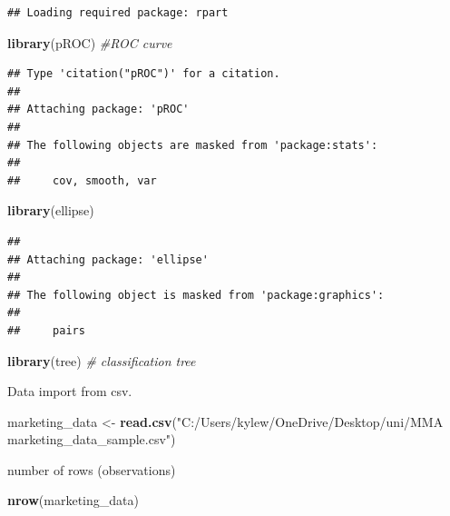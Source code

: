 \documentclass[
]{article}
\newenvironment{Shaded}{\begin{snugshade}}{\end{snugshade}}
\newcommand{\CommentTok}[1]{\textcolor[rgb]{0.56,0.35,0.01}{\textit{#1}}}
\newcommand{\FunctionTok}[1]{\textcolor[rgb]{0.13,0.29,0.53}{\textbf{#1}}}
\newcommand{\NormalTok}[1]{#1}
\newcommand{\OtherTok}[1]{\textcolor[rgb]{0.56,0.35,0.01}{#1}}
\newcommand{\StringTok}[1]{\textcolor[rgb]{0.31,0.60,0.02}{#1}}
\begin{document}
\begin{verbatim}
## Loading required package: rpart
\end{verbatim}

\begin{Shaded}
\begin{Highlighting}[]
\FunctionTok{library}\NormalTok{(pROC) }\CommentTok{\#ROC curve}
\end{Highlighting}
\end{Shaded}

\begin{verbatim}
## Type 'citation("pROC")' for a citation.
## 
## Attaching package: 'pROC'
## 
## The following objects are masked from 'package:stats':
## 
##     cov, smooth, var
\end{verbatim}

\begin{Shaded}
\begin{Highlighting}[]
\FunctionTok{library}\NormalTok{(ellipse)}
\end{Highlighting}
\end{Shaded}

\begin{verbatim}
## 
## Attaching package: 'ellipse'
## 
## The following object is masked from 'package:graphics':
## 
##     pairs
\end{verbatim}

\begin{Shaded}
\begin{Highlighting}[]
\FunctionTok{library}\NormalTok{(tree) }\CommentTok{\# classification tree}
\end{Highlighting}
\end{Shaded}

Data import from csv.

\begin{Shaded}
\begin{Highlighting}[]
\NormalTok{marketing\_data }\OtherTok{\textless{}{-}} \FunctionTok{read.csv}\NormalTok{(}\StringTok{"C:/Users/kylew/OneDrive/Desktop/uni/MMA marketing\_data\_sample.csv"}\NormalTok{)}
\end{Highlighting}
\end{Shaded}

number of rows (observations)

\begin{Shaded}
\begin{Highlighting}[]
\FunctionTok{nrow}\NormalTok{(marketing\_data)}
\end{Highlighting}
\end{Shaded}
\end{document}
